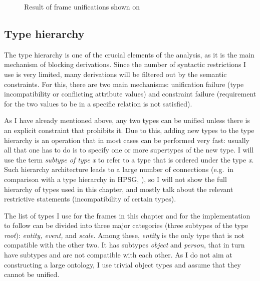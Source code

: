 \begin{figure}
\caption{Result of frame unifications shown on  \label{frame:love}}
\end{figure}


\subsection{Type hierarchy}\label{section:types}
The type hierarchy is one of the crucial elements of the analysis, as it is the main mechanism of blocking derivations. Since the number of syntactic restrictions I use is very limited, many derivations will be filtered out by the semantic constraints. For this, there are two main mechanisms: unification failure (type incompatibility or conflicting attribute values) and constraint failure (requirement for the two values to be in a specific relation is not satisfied). 

As I have already mentioned above, any two types can be unified unless there is an explicit constraint that prohibits it. Due to this, adding new types to the type hierarchy is an operation that in most cases can be performed very fast: usually all that one has to do is to specify one or more supertypes of the new type. I will use the term \textit{subtype of type x} to refer to a type that is ordered under the type \textit{x}. Such hierarchy architecture leads to a large number of connections (e.g.\ in comparison  with a type hierarchy in HPSG, \citealt{PollardSag:94}), so I will not show the full hierarchy of types used in this chapter, and mostly talk about the relevant restrictive statements (incompatibility of certain types).

The list of types I use for the frames in this chapter and for the implementation to follow can be divided into three major categories (three subtypes of the type \textit{root}): \textit{entity, event,} and \textit{scale.} Among these, \textit{entity} is the only type that is not compatible with the other two. It has subtypes \textit{object} and \textit{person}, that in turn have subtypes and are not compatible with each other. As I do not aim at constructing a large ontology, I use trivial object types and assume that they cannot be unified.

